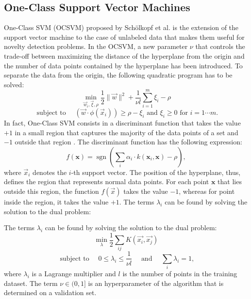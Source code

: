 \subsection{One-Class Support Vector Machines}
\label{sec:ocsvm_theory}
One-Class SVM (OCSVM) proposed by Sch{\"o}lkopf et al. \cite{scholkopf2000support} is the extension of the support vector machine to the case of unlabeled data that makes them useful for novelty detection problems. In the OCSVM, a new parameter $\nu$ 
that controls the trade-off between maximizing the distance of the hyperplane from the origin and the number of data points contained by the hyperplane has been introduced. To separate the data from the origin, the following quadratic program has to be solved:
\begin{equation}
\label{eq:ocsv_quadratic_problem}
\min_{\vec{w}_i, \vec{\xi}, \rho} \frac{1}{2} \|\vec{w}\|^2 +  \frac{1}{\nu l}\sum_{i = 1}^{m}\xi_i - \rho
\end{equation}
\begin{equation}\nonumber
\textrm{ subject to }\quad ( \vec{w}\cdot \phi(\vec{x}_i))  \geq \rho - \xi_i \textrm{ and } \xi_i \geq 0 \textrm{ for } i = 1 \cdots m.
\end{equation}
In fact, One-Class SVM consists in a discriminant function that takes the value $+1$ in a small region that captures the majority of the data points of a set and $-1$ outside that region \cite{scholkopf2000}. The discriminant function has the following expression:
\begin{equation}\label{eq:svm}
f(\mathbf{x}) = \mathop{\mathrm{sgn}} \left( \sum_{i} \alpha_i \cdot k(\mathbf{x}_i,\mathbf{x}) - \rho\right),
\end{equation}
where $ \vec{x}_i$ denotes the $i$-th support vector. The position of the hyperplane, thus, defines the region that represents normal data points. For each point $\textbf{x}$ that lies outside this region, the function $f( \vec{x})$ takes the value $-1$, whereas for point inside the region, it takes the value $+1$.
The terms $\lambda_i$ can be found by solving the solution to the dual problem:


The terms $\lambda_i$ can be found by solving the solution to the dual problem:
\begin{equation}
\min_{\lambda} \frac{1}{2} \sum_{ij}^{} K(\vec{x_i}, \vec{x_j}) 
\end{equation}
\begin{equation}\nonumber
\textrm{ subject to }\quad 0 \leq \lambda_i \leq \frac{1}{\nu l}\quad \textrm{ and }\quad \sum_{i}^{} \lambda_i = 1,
\end{equation}
where $\lambda_i$ is a Lagrange  multiplier and $l$ is the number of points in the  training dataset.
The term $\nu \in (0,1]$ is an hyperparameter of the algorithm that is determined on a validation set. 

